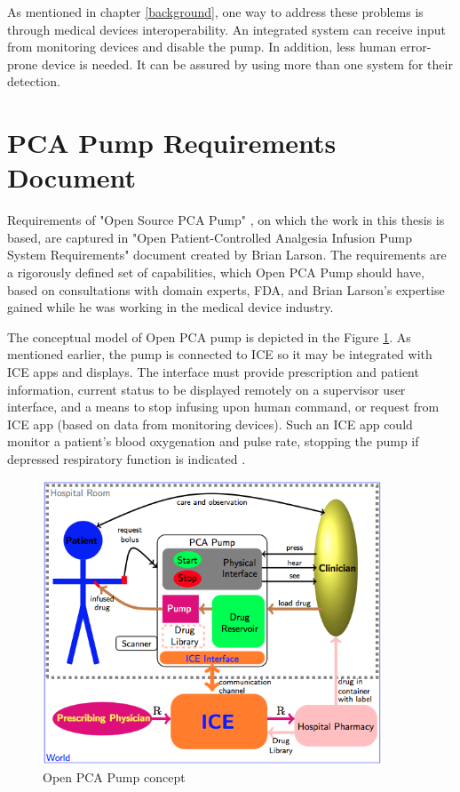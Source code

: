 As mentioned in chapter \ref{background}, one way to address these problems is through medical devices interoperability. An integrated system can receive input from monitoring devices and disable the pump. In addition, less human error-prone device is needed. It can be assured by using more than one system for their detection.



\section{PCA Pump Requirements Document}
\label{pcapump:requirements-doc}

Requirements of "Open Source PCA Pump" \cite{OpenSourcePCAPump:Paper}, on which the work in this thesis is based, are captured in "Open Patient-Controlled Analgesia Infusion Pump System Requirements" document \cite{PcaReq} created by Brian Larson. The requirements are a rigorously defined set of capabilities, which Open PCA Pump should have, based on consultations with domain experts, FDA, and Brian Larson's expertise gained while he was working in the medical device industry.

The conceptual model of Open PCA pump is depicted in the Figure \ref{figure:ice-pca-pump}. As mentioned earlier, the pump is connected to ICE so it may be integrated with ICE apps and displays. The interface must provide prescription and patient information, current status to be displayed remotely on a supervisor user interface, and a means to stop infusing upon human command, or request from ICE app (based on data from monitoring devices). Such an ICE app could monitor a patient's blood oxygenation and pulse rate, stopping the pump if depressed respiratory function is indicated \cite{PcaReq}.

\begin{figure}[ht]%
    \begin{center}
      \includegraphics[width=0.9\textwidth]{figures/ice-pca-pump.png}      
    \end{center}
    \caption{Open PCA Pump concept}
    \label{figure:ice-pca-pump}
\end{figure}

